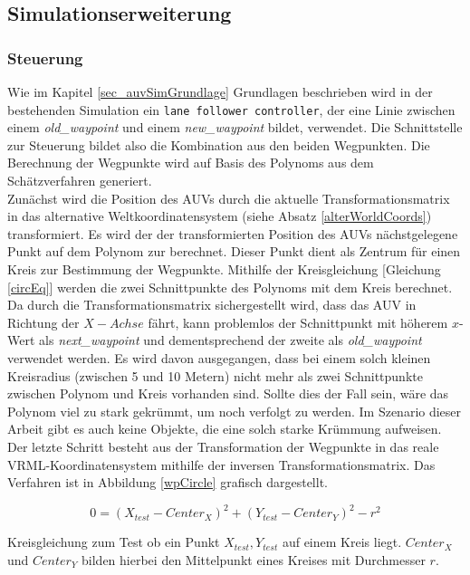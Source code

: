 \subsection{Simulationserweiterung}
\subsubsection{Steuerung}
\label{sec_waypoint}
Wie im Kapitel \ref{sec_auvSimGrundlage} Grundlagen beschrieben wird in der bestehenden Simulation ein \texttt{lane follower controller}, der eine Linie zwischen einem \textit{old\_waypoint} und einem \textit{new\_waypoint} bildet, verwendet.
Die Schnittstelle zur Steuerung bildet also die Kombination aus den beiden Wegpunkten. Die Berechnung der Wegpunkte wird auf Basis des Polynoms aus dem Schätzverfahren generiert.\\
Zunächst wird die Position des AUVs durch die aktuelle Transformationsmatrix in das alternative Weltkoordinatensystem (siehe Absatz \ref{alterWorldCoords}) transformiert. Es wird der der transformierten Position des AUVs nächstgelegene Punkt auf dem Polynom zur  berechnet. Dieser Punkt dient als Zentrum für einen Kreis zur Bestimmung der Wegpunkte. Mithilfe der Kreisgleichung [Gleichung \ref{circEq}] werden die zwei Schnittpunkte des Polynoms mit dem Kreis berechnet. Da durch die Transformationsmatrix sichergestellt wird, dass das AUV in Richtung der $X-Achse$ fährt, kann problemlos der Schnittpunkt mit höherem $x$-Wert als \textit{next\_waypoint} und dementsprechend der zweite als \textit{old\_waypoint} verwendet werden. Es wird davon ausgegangen, dass bei einem solch kleinen Kreisradius (zwischen 5 und 10 Metern) nicht mehr als zwei Schnittpunkte zwischen Polynom und Kreis vorhanden sind. Sollte dies der Fall sein, wäre das Polynom viel zu stark gekrümmt, um noch verfolgt zu werden. Im Szenario dieser Arbeit gibt es auch keine Objekte, die eine solch starke Krümmung aufweisen.\\
Der letzte Schritt besteht aus der Transformation der Wegpunkte in das reale VRML-Koordinatensystem mithilfe der inversen Transformationsmatrix.
Das Verfahren ist in Abbildung \ref{wpCircle} grafisch dargestellt.

\begin{ownequation}[H]
\begin{equation}
0 = (X_{test}-Center_X)^2+(Y_{test}-Center_Y)^2 - r^2
\end{equation}
\caption[Kreisgleichung zum Test, ob ein Punkt auf einem Kreis liegt.]{Kreisgleichung zum Test ob ein Punkt $X_{test},Y_{test}$ auf einem Kreis liegt. $Center_X$ und $Center_Y$ bilden hierbei den Mittelpunkt eines Kreises mit Durchmesser $r$.}
\label{circEq}
\end{ownequation}

